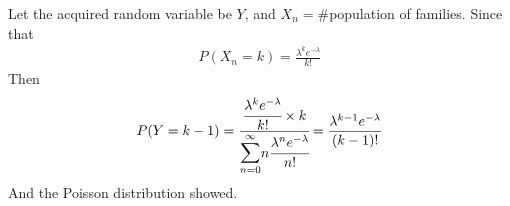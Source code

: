 \documentclass[en,hazy,blue,12pt,device = normal]{elegantnote}
\begin{document}
\begin{enumerate}
    \begin{tcolorbox}
        \sol

        Let the acquired random variable be \(Y\), and \(X_n = \#\)population of families. Since that 
        \begin{align*}
            P(X_n = k) = \frac{\lambda^k e^{-\lambda}}{k!}
        \end{align*}
        Then 
        \begin{align*}
            P(Y = k-1) = \cfrac{\cfrac{\lambda^k e^{-\lambda}}{k!}\times k}{\mathlarger{\mathlarger{\sum}}_{n = 0}^\infty n \cfrac{\lambda^n e^{-\lambda}}{n!}}
            = \frac{\lambda^{k-1} e^{-\lambda}}{(k-1)!}
        \end{align*}
        And the Poisson distribution showed.
    \end{tcolorbox}
\end{enumerate}
\end{document}
